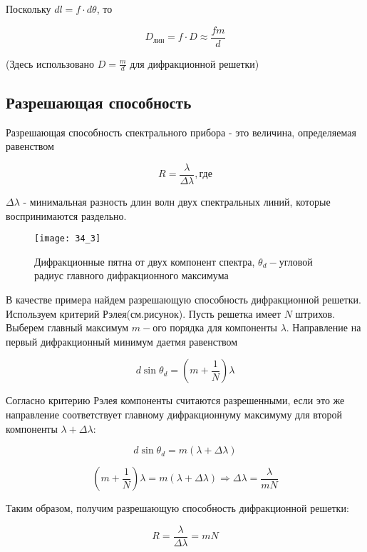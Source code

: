 Поскольку $ dl = f\cdot d\theta$, то

\begin{equation*}
    D_{\text{лин}} = f \cdot D \approx \frac{fm}{d}
\end{equation*}

(Здесь использовано $D = \frac{m}{d}$ для дифракционной решетки)
\subsection{Разрешающая способность}

Разрешающая способность спектрального прибора - это величина, определяемая равенством

\begin{equation*}
    R = \frac{\lambda}{\Delta \lambda}, \text{где}
\end{equation*}

$\Delta \lambda$ - минимальная разность длин волн двух спектральных линий, которые воспринимаются раздельно.

\begin{figure}[h!]
    \centering
    \texttt{[image: 34\_3]}
    \caption{Дифракционные пятна от двух компонент спектра, $\theta_d - $угловой радиус главного дифракционного максимума}
    \label{fig:my_label}
\end{figure} 


В качестве примера найдем разрешающую способность дифракционной решетки. Используем критерий Рэлея(см.рисунок). Пусть решетка имеет $N$ штрихов. Выберем главный максимум $m-$ого порядка для компоненты $\lambda$. Направление на первый дифракционный минимум даетмя равенством

\begin{equation*}
    d\sin \theta_d = \left(m + \frac{1}{N}\right) \lambda
\end{equation*}

Согласно критерию Рэлея компоненты считаются разрешенными, если это же направление соответствует главному дифракционнуму максимуму для второй компоненты $\lambda + \Delta \lambda$:

\begin{equation*}
    d\sin \theta_d = m(\lambda + \Delta\lambda)
\end{equation*}

\begin{equation*}
   \left(m + \frac{1}{N}\right) \lambda = m(\lambda + \Delta \lambda) \Rightarrow \Delta \lambda = \frac{\lambda}{mN}
\end{equation*}

Таким образом, получим разрешающую способность дифракционной решетки:

\begin{equation*}
   R = \frac{\lambda}{\Delta \lambda} = mN
\end{equation*}




